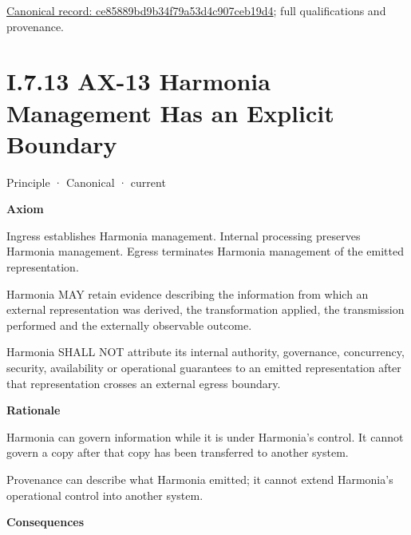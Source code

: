 {\footnotesize \href{../../../../../../../../continuum/motivation/principle/ce85889bd9b34f79a53d4c907ceb19d4.md}{Canonical record: ce85889bd9b34f79a53d4c907ceb19d4}; full qualifications and provenance.}\par
\section*{I.7.13 AX-13 Harmonia Management Has an Explicit Boundary}
\label{navigation:I.7.13}

\label{element:b6a55decfeec4f1bb3d7f18534a2ffea}
{\small Principle · Canonical · current}\par

\par\medskip\textbf{Axiom}\par


Ingress establishes Harmonia management. Internal processing preserves
Harmonia management. Egress terminates Harmonia management of the
emitted representation.



Harmonia MAY retain evidence describing the information from which an
external representation was derived, the transformation applied, the
transmission performed and the externally observable outcome.



Harmonia SHALL NOT attribute its internal authority, governance,
concurrency, security, availability or operational guarantees to an
emitted representation after that representation crosses an external
egress boundary.



\par\medskip\textbf{Rationale}\par


Harmonia can govern information while it is under Harmonia's control. It
cannot govern a copy after that copy has been transferred to another
system.



Provenance can describe what Harmonia emitted; it cannot extend
Harmonia's operational control into another system.



\par\medskip\textbf{Consequences}\par


